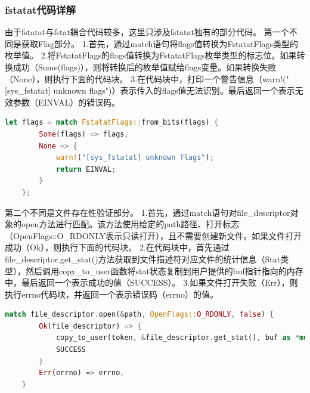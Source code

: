 \subsubsection{fstatat代码详解}
由于fstatat与fstat耦合代码较多，这里只涉及fstatat独有的部分代码。
第一个不同是获取Flag部分。
1.首先，通过match语句将flags值转换为FstatatFlags类型的枚举值。
2.将FstatatFlags的flags值转换为FstatatFlags枚举类型的标志位。如果转换成功（Some(flags)），则将转换后的枚举值赋给flags变量。如果转换失败（None），则执行下面的代码块。
3.在代码块中，打印一个警告信息（warn!("[sys_fstatat] unknown flags")）表示传入的flags值无法识别。最后返回一个表示无效参数（EINVAL）的错误码。
\begin{lstlisting}[language={Rust},
	caption={FstatatFlag判断}]
    let flags = match FstatatFlags::from_bits(flags) {
        Some(flags) => flags,
        None => {
            warn!("[sys_fstatat] unknown flags");
            return EINVAL;
        }
    };
\end{lstlisting}
第二个不同是文件存在性验证部分。
1.首先，通过match语句对file_descriptor对象的open方法进行匹配。该方法使用给定的path路径、打开标志（OpenFlags::O_RDONLY表示只读打开），且不需要创建新文件。如果文件打开成功（Ok），则执行下面的代码块。
2.在代码块中，首先通过file_descriptor.get_stat()方法获取到文件描述符对应文件的统计信息（Stat类型），然后调用copy_to_user函数将stat状态复制到用户提供的buf指针指向的内存中，最后返回一个表示成功的值（SUCCESS）。
3.如果文件打开失败（Err），则执行errno代码块，并返回一个表示错误码（errno）的值。
\begin{lstlisting}[language={Rust},
	caption={存在性验证与stat拷贝}]
    match file_descriptor.open(&path, OpenFlags::O_RDONLY, false) {
        Ok(file_descriptor) => {
            copy_to_user(token, &file_descriptor.get_stat(), buf as *mut Stat);
            SUCCESS
        }
        Err(errno) => errno,
    }
\end{lstlisting}